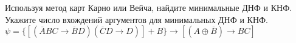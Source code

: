 \question Используя метод карт Карно или Вейча, найдите минимальные ДНФ и КНФ. Укажите число вхождений аргументов для минимальных ДНФ и КНФ.
$\psi = \{[(\overline{A}BC \rightarrow \overline{B}D)(\overline{C}D \rightarrow D)]+B\} \rightarrow [(A \oplus \overline{B}) \rightarrow BC]$